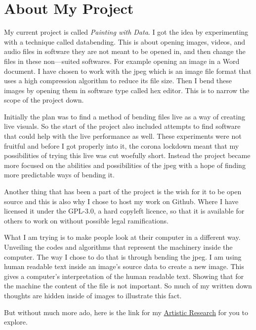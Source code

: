 \documentclass[12pt, letterpaper]{article}
\begin{document}
\section{About My Project}
My current project is called \textit{Painting with Data}. I got the idea by
experimenting
with a technique called databending. This is about opening images,
videos, and audio files in software they are not meant to be opened in, and then
change the files in these non---suited softwares. For example opening an image
in a Word document. I have chosen to work with the jpeg  which is an
image file format that uses a high compression algorithm to reduce its file
size. Then I bend these images by opening them in software type called
hex editor. This is to narrow the scope of the project down.
\par
Initially the plan was to find a method of bending files live as a way of
creating
live visuals. So the start of the project also included attempts to find
software that
could help with the live performance as well. These experiments were not
fruitful and before I got properly into it, the corona lockdown meant that my
possibilities of trying this live was cut woefully short. Instead the project
became more focused on the abilities and possibilities of the jpeg with a
hope of finding more predictable ways of bending it.
\par
Another thing that has been a part of the project is the wish for it to be open
source and this is also why I chose to host my work on Github. Where I have
licensed it under the GPL-3.0, a hard copyleft licence, so that it is available
for others to work on without possible legal ramifications.
\par
What I am trying is to make people look at their computer in a different way.
Unveiling the codes and algorithms that represent the machinery inside the
computer. The way I chose to do that is through bending the jpeg. I am using
human readable text inside an image's source data to create a new image. This
gives a computer's interpretation of the human readable text. Showing that for
the machine the content of the file is not important. So much of my written down
thoughts are hidden inside of images to illustrate this fact.
\par
\medskip
\noindent But without much more ado, here is the link for my
\href{https://github.com/aa-83/artistic_research}{Artistic Research} for you
to explore.
\end{document}
